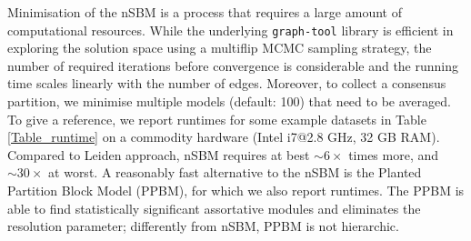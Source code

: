 \documentclass[10pt]{article}
\begin{document}
Minimisation of the nSBM is a process that requires a large amount of computational resources. While the underlying \texttt{graph-tool} library is efficient in exploring the solution space using a multiflip MCMC sampling strategy, the number of required iterations before convergence is considerable and the running time scales linearly with the number of edges. Moreover, to collect a consensus partition, we minimise multiple models (default: 100) that need to be averaged. To give a reference, we report runtimes for some example datasets in Table \ref{Table_runtime} on a commodity hardware (Intel i7@2.8 GHz, 32 GB RAM). Compared to Leiden approach, nSBM requires at best $\sim6\times$ times more, and $\sim30\times$  at worst. A reasonably fast alternative to the nSBM is the Planted Partition Block Model (PPBM), for which we also report runtimes. The PPBM \cite{Zhang_Peixoto_2020} is able to find statistically significant assortative modules and eliminates the resolution parameter; differently from nSBM, PPBM is not hierarchic.
\end{document}
